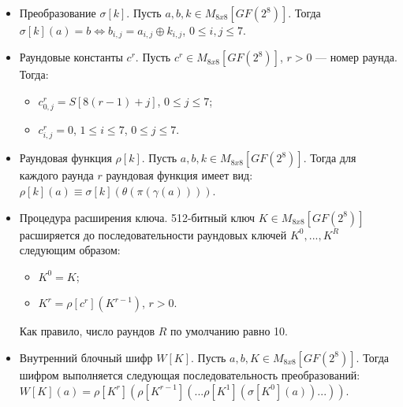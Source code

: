 \documentclass{./civarticle}
\begin{document}
\begin{itemize}
    \item Преобразование $\sigma[k]$. Пусть $a, b, k \in  M_{8x8}[GF(2^8)]$. Тогда $\sigma[k](a) = b \iff b_{i, j} = a_{i, j} \oplus k_{i, j}$, $0 \leq i, j \leq 7$.

    \item Раундовые константы $c^r$. Пусть $c^r \in  M_{8x8}[GF(2^8)]$, $r > 0$ --- номер раунда. Тогда:
    \begin{itemize}
        \item $c_{0, j}^r = S[8(r - 1) + j]$, $0 \leq j \leq 7$;
        \item $c_{i, j}^r = 0$, $1 \leq i \leq 7$, $0 \leq j \leq 7$.
    \end{itemize}

    \item Раундовая функция $\rho[k]$. Пусть $a, b, k \in  M_{8x8}[GF(2^8)]$. Тогда для каждого раунда $r$ раундовая функция имеет вид: $\rho[k](a) \equiv \sigma[k](\theta(\pi(\gamma(a))))$.

    \item Процедура расширения ключа. 512-битный ключ $K \in  M_{8x8}[GF(2^8)]$ расширяется до последовательности раундовых ключей $K^0, ..., K^R$ следующим образом:

    \begin{itemize}
        \item $K^0 = K$;
        \item $K^r = \rho[c^r](K^{r-1})$, $r > 0$.
    \end{itemize}

    Как правило, число раундов $R$ по умолчанию равно 10.

    \item Внутренний блочный шифр $W[K]$. Пусть $a, b, K \in  M_{8x8}[GF(2^8)]$. Тогда шифром выполняется следующая последовательность преобразований: $W[K](a) = \rho[K^r](\rho[K^{r-1}](...\rho[K^1](\sigma[K^0](a))...))$.
    
\end{itemize}
\end{document}
